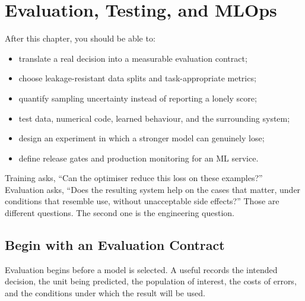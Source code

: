 \chapter{Evaluation, Testing, and MLOps}
\label{ch:evaluation-mlops}

\begin{learningobjectives}
After this chapter, you should be able to:
\begin{itemize}
    \item translate a real decision into a measurable evaluation contract;
    \item choose leakage-resistant data splits and task-appropriate metrics;
    \item quantify sampling uncertainty instead of reporting a lonely score;
    \item test data, numerical code, learned behaviour, and the surrounding
          system;
    \item design an experiment in which a stronger model can genuinely lose;
    \item define release gates and production monitoring for an ML service.
\end{itemize}
\end{learningobjectives}

\begin{plainlanguage}
Training asks, ``Can the optimiser reduce this loss on these examples?''
Evaluation asks, ``Does the resulting system help on the cases that matter,
under conditions that resemble use, without unacceptable side effects?''
Those are different questions.
The second one is the engineering question.
\end{plainlanguage}

\section{Begin with an Evaluation Contract}

Evaluation begins before a model is selected.
A useful  records the intended decision, the unit
being predicted, the population of interest, the costs of errors, and the
conditions under which the result will be used.

